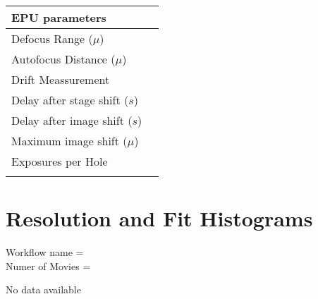 \documentclass[12pt,a4paper]{article}
\newif\iflong
\begin{document}
%
  \hspace{1cm}
%
\begin{tabulary}{\linewidth}{L L}
  \\\hline
  EPU parameters &  \\\hline
  Defocus Range ($\mu$)&  \\\hline
  Autofocus Distance ($\mu$) & 
       \\\hline
  Drift Meassurement  &
       \\\hline %
  Delay after stage shift ($s$) & 
       \\\hline
  Delay after image shift ($s$) &
       \\\hline
  Maximum image shift ($\mu$) &
       \\\hline
  Exposures per Hole&
       \\\hline
      &\\
\end{tabulary}

\newpage
\section*{Resolution and Fit Histograms}

Workflow name = \\
Numer of Movies = 
\iflong
\begin{figure}[!htbp]
    \caption{Resolution Histogram.\label{fig:resHist}}
    \centering
    }
\end{figure}

\begin{figure}[!htbp]
    \caption{Defocus Histogram.\label{fig:defHist}}
    \centering
    }
\end{figure}
\else
No data available
\fi
\end{document}
